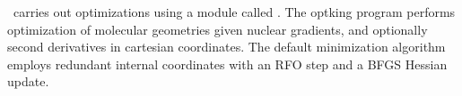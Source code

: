 %
%
%
%

\PSIfour\ carries out optimizations using a module called \PSIoptking.
The optking program performs optimization of molecular geometries given
nuclear gradients, and optionally second derivatives in cartesian
coordinates. The default minimization algorithm employs redundant internal
coordinates with an RFO step and a BFGS Hessian update.

